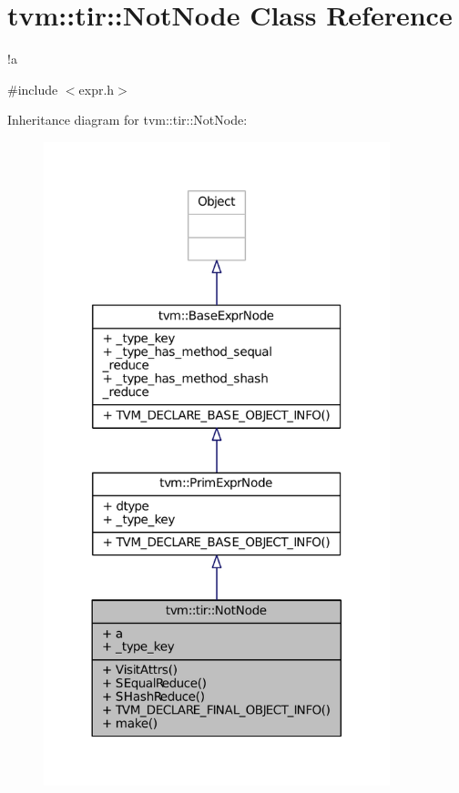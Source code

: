 \hypertarget{classtvm_1_1tir_1_1NotNode}{}\section{tvm\+:\+:tir\+:\+:Not\+Node Class Reference}
\label{classtvm_1_1tir_1_1NotNode}


!a  




{\ttfamily \#include $<$expr.\+h$>$}



Inheritance diagram for tvm\+:\+:tir\+:\+:Not\+Node\+:
\nopagebreak
\begin{figure}[H]
\begin{center}
\leavevmode
\includegraphics[width=285pt]{classtvm_1_1tir_1_1NotNode__inherit__graph}
\end{center}
\end{figure}


